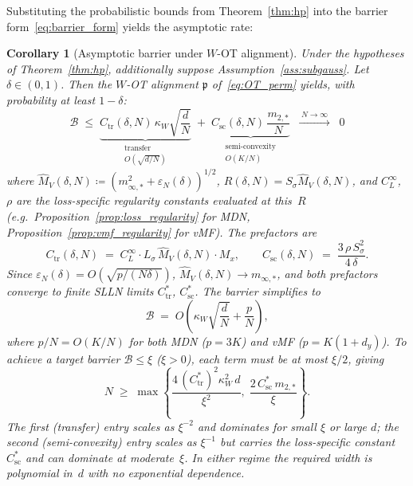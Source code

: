 \documentclass[11pt]{article}
\newtheorem{corollary}[theorem]{Corollary}
\newcommand{\cB}{\mathcal{B}}
\newcommand{\nperm}{\mathfrak{p}}  %
\begin{document}
Substituting the probabilistic bounds from Theorem~\ref{thm:hp} into the barrier form~\eqref{eq:barrier_form} yields the asymptotic rate:

\begin{corollary}[Asymptotic barrier under $W$-OT alignment]
\label{cor:asymptotic}
Under the hypotheses of Theorem~\ref{thm:hp},
additionally suppose Assumption~\ref{ass:subgauss}.
Let $\delta \in (0,1)$.  Then the $W$-OT alignment $\nperm$
of~\eqref{eq:OT_perm} yields, with probability at least $1-\delta$:
\begin{equation}\label{eq:barrier_bound}
  \boxed{
  \cB \;\le\;
  \underbrace{C_{\mathrm{tr}}(\delta,N)\,\kappa_W\sqrt{\frac{d}{N}}}_{\substack{\text{transfer}\\[2pt]
    \scriptscriptstyle O(\sqrt{d/N})}}
  \;+\;
  \underbrace{C_{\mathrm{sc}}(\delta,N)\,\frac{m_{2,*}}{N}}_{\substack{\text{semi-convexity}\\[2pt]
    \scriptscriptstyle O(K/N)}}
  \;\;\xrightarrow{\;N\to\infty\;}\;\; 0
  }
\end{equation}
where
$\hat M_V(\delta,N) \coloneqq (m_{\infty,*}^2 + \varepsilon_N(\delta))^{1/2}$,
$R(\delta,N) = S_\sigma \hat M_V(\delta,N)$,
and $C_L^\infty$, $\rho$ are the loss-specific regularity constants
evaluated at this~$R$
(e.g.\ Proposition~\ref{prop:loss_regularity} for MDN,
Proposition~\ref{prop:vmf_regularity} for vMF).
The prefactors are
\begin{equation}\label{eq:prefactors}
  C_{\mathrm{tr}}(\delta,N)
  \;=\; C_L^\infty \cdot L_\sigma\,\hat M_V(\delta,N)
        \cdot M_x,
  \qquad
  C_{\mathrm{sc}}(\delta,N)
  \;=\; \frac{3\,\rho\,S_\sigma^2}{4\,\delta}.
\end{equation}
Since $\varepsilon_N(\delta) = O(\sqrt{p/(N\delta)})$,
$\hat M_V(\delta,N) \to m_{\infty,*}$, and both prefactors converge
to finite SLLN limits $C_{\mathrm{tr}}^*$, $C_{\mathrm{sc}}^*$.
The barrier simplifies to
\begin{equation}\label{eq:barrier_rate_sg}
  \cB \;=\; O\!\left(\kappa_W\sqrt{\frac{d}{N}} + \frac{p}{N}\right),
\end{equation}
where $p/N = O(K/N)$ for both MDN ($p=3K$) and vMF ($p=K(1\!+\!d_y)$).
To achieve a target barrier $\cB \le \xi$ ($\xi > 0$),
each term must be at most $\xi/2$, giving
\begin{equation}\label{eq:width_req}
  N \;\ge\;
  \max\!\left\{
    \frac{4\,(C_{\mathrm{tr}}^*)^2 \kappa_W^2\,d}{\xi^2},\;
    \frac{2\,C_{\mathrm{sc}}^*\,m_{2,*}}{\xi}
  \right\}.
\end{equation}
The first (transfer) entry scales as $\xi^{-2}$ and dominates
for small $\xi$ or large $d$;
the second (semi-convexity) entry scales as $\xi^{-1}$ but carries
the loss-specific constant $C_{\mathrm{sc}}^*$ and can dominate at moderate~$\xi$.
In either regime the required width is polynomial in~$d$
with no exponential dependence.
\end{corollary}
\end{document}
